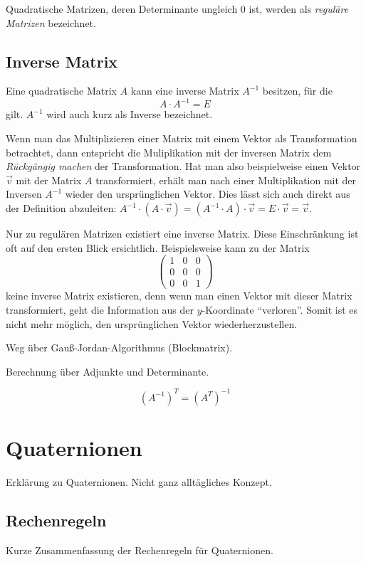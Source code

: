 Quadratische Matrizen, deren Determinante ungleich 0 ist, werden als \emph{reguläre Matrizen} bezeichnet.

\subsection{Inverse Matrix}
Eine quadratische Matrix $A$ kann eine inverse Matrix $A^{-1}$ besitzen, für die
\begin{equation}
 A \cdot A^{-1} = E
\end{equation}
gilt. $A^{-1}$ wird auch kurz als Inverse bezeichnet.

Wenn man das Multiplizieren einer Matrix mit einem Vektor als Transformation betrachtet, dann entspricht die Muliplikation mit der inversen Matrix dem \emph{Rückgängig machen} der Transformation. Hat man also beispielweise einen Vektor $\vec v$ mit der Matrix $A$ transformiert, erhält man nach einer Multiplikation mit der Inversen $A^{-1}$ wieder den ursprünglichen Vektor. Dies lässt sich auch direkt aus der Definition abzuleiten: $A^{-1} \cdot ( A \cdot \vec v ) = (A^{-1} \cdot A) \cdot \vec v = E \cdot \vec v = \vec v$.

Nur zu regulären Matrizen existiert eine inverse Matrix. Diese Einschränkung ist oft auf den ersten Blick ersichtlich. Beispielsweise kann zu der Matrix
\begin{equation}
 \begin{pmatrix}
  1 & 0 & 0 \\
  0 & 0 & 0 \\
  0 & 0 & 1
 \end{pmatrix}
\end{equation}
keine inverse Matrix existieren, denn wenn man einen Vektor mit dieser Matrix transformiert, geht die Information aus der $y$-Koordinate \enquote{verloren}. Somit ist es nicht mehr möglich, den ursprünglichen Vektor wiederherzustellen.

Weg über Gauß-Jordan-Algorithmus (Blockmatrix).

Berechnung über Adjunkte und Determinante.

\begin{equation}
 (A^{-1})^T = (A^T)^{-1}
\end{equation}


\section{Quaternionen}
Erklärung zu Quaternionen. Nicht ganz alltägliches Konzept.

\subsection{Rechenregeln}
Kurze Zusammenfassung der Rechenregeln für Quaternionen.